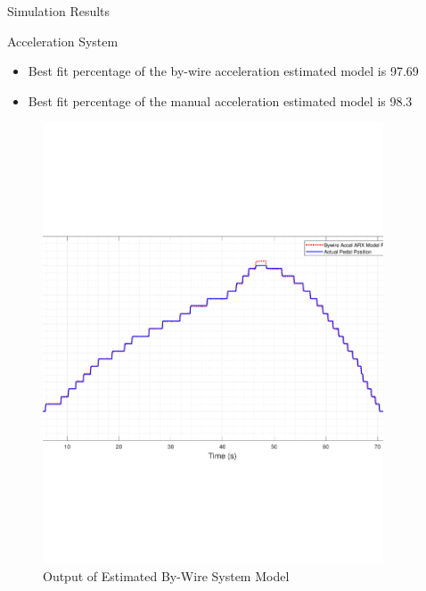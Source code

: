 \documentclass{beamer}
\begin{document}
\begin{frame}{Simulation Results}
  \begin{block}{Acceleration System}
 \begin{itemize}
	\item Best fit percentage of the by-wire acceleration estimated model is 97.69
	\item Best fit percentage of the manual acceleration estimated model is 98.3
 \end{itemize}
 \begin{figure}
    \centering
    \begin{minipage}{0.45\textwidth}
        \centering
        \includegraphics[width=0.9\textwidth]{figs/img/byWireAccelArxModel} %
        \caption{Output of Estimated By-Wire System Model}
        \label{fig:byWireAccelModel}
    \end{minipage}\hfill
    \begin{minipage}{0.45\textwidth}
        \centering

\end{minipage}
\end{figure}
\end{block}
\end{frame}
\end{document}
